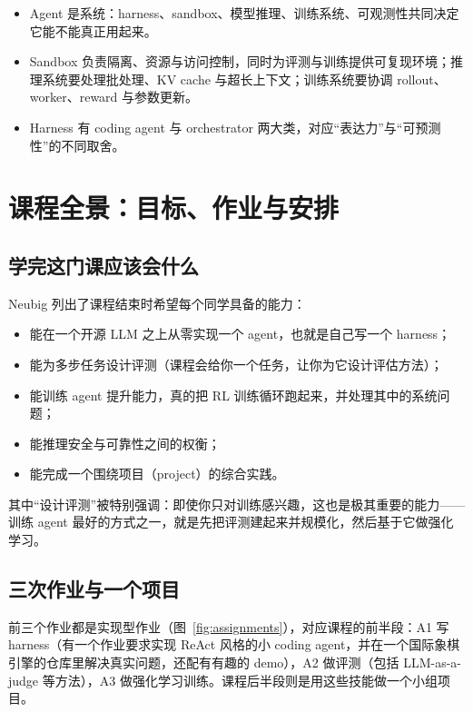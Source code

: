 \documentclass[a4paper]{article}
\begin{document}
\begin{itemize}
\item Agent 是系统：harness、sandbox、模型推理、训练系统、可观测性共同决定它能不能真正用起来。
\item Sandbox 负责隔离、资源与访问控制，同时为评测与训练提供可复现环境；推理系统要处理批处理、KV cache 与超长上下文；训练系统要协调 rollout、worker、reward 与参数更新。
\item Harness 有 coding agent 与 orchestrator 两大类，对应“表达力”与“可预测性”的不同取舍。
\end{itemize}

\section{课程全景：目标、作业与安排}

\subsection{学完这门课应该会什么}

Neubig 列出了课程结束时希望每个同学具备的能力：

\begin{itemize}
\item 能在一个开源 LLM 之上从零实现一个 agent，也就是自己写一个 harness；
\item 能为多步任务设计评测（课程会给你一个任务，让你为它设计评估方法）；
\item 能训练 agent 提升能力，真的把 RL 训练循环跑起来，并处理其中的系统问题；
\item 能推理安全与可靠性之间的权衡；
\item 能完成一个围绕项目（project）的综合实践。
\end{itemize}

其中“设计评测”被特别强调：即使你只对训练感兴趣，这也是极其重要的能力——训练 agent 最好的方式之一，就是先把评测建起来并规模化，然后基于它做强化学习。

\subsection{三次作业与一个项目}

前三个作业都是实现型作业（图~\ref{fig:assignments}），对应课程的前半段：A1 写 harness（有一个作业要求实现 ReAct 风格的小 coding agent，并在一个国际象棋引擎的仓库里解决真实问题，还配有有趣的 demo），A2 做评测（包括 LLM-as-a-judge 等方法），A3 做强化学习训练。课程后半段则是用这些技能做一个小组项目。
\end{document}
